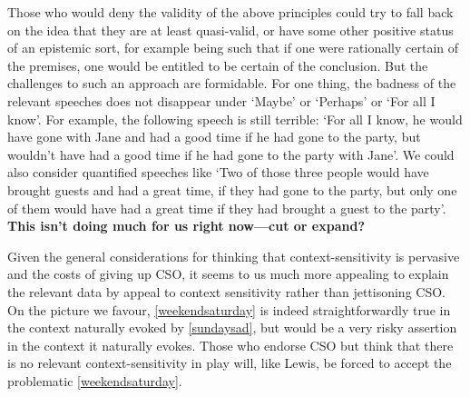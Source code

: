 \documentclass[If.tex]{subfiles}
\begin{document}
\begin{prop}
Those who would deny the validity of the above principles could try to fall back on the idea that they are at least quasi-valid, or have some other positive status of an epistemic sort, for example being such that if one were rationally certain of the premises, one would be entitled to be certain of the conclusion. But the challenges to such an approach are formidable. For one thing, the badness of the relevant speeches does not disappear under ‘Maybe’ or ‘Perhaps’ or ‘For all I know’. For example, the following speech is still terrible: ‘For all I know, he would have gone with Jane and had a good time if he had gone to the party, but wouldn't have had a good time if he had gone to the party with Jane’. We could also consider quantified speeches like ‘Two of those three people would have brought guests and had a great time, if they had gone to the party, but only one of them would have had a great time if they had brought a guest to the party’. \textbf{This isn't doing much for us right now---cut or expand?}

Given the general considerations for thinking that context-sensitivity is pervasive and the costs of giving up CSO, it seems to us much more appealing to explain the relevant data by appeal to context sensitivity rather than jettisoning CSO. On the picture we favour, \ref{weekendsaturday} is indeed straightforwardly true in the context naturally evoked by \ref{sundaysad}, but would be a very risky assertion in the context it naturally evokes. Those who endorse CSO but think that there is no relevant context-sensitivity in play will, like Lewis, be forced to accept the problematic \ref{weekendsaturday}.


\end{prop}
\end{document}
